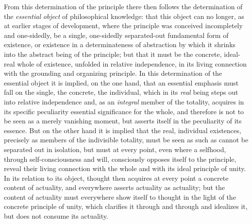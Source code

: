 From this determination of the principle there then follows the
determination of the \emph{essential} \emph{object} of philosophical
knowledge: that this object can no longer, as at earlier stages of
development, where the principle was conceived incompletely and
one-sidedly, be a single, one-sidedly separated-out fundamental form of
existence, or existence in a determinateness of abstraction by which it
shrinks into the abstract being of the principle; but that it must be
the concrete, ideal-real whole of existence, unfolded in relative
independence, in its living connection with the grounding and
organizing principle. In this determination of the essential object it
is implied, on the one hand, that an essential emphasis must fall on
the single, the concrete, the individual, which in its \emph{real}
being steps out into relative independence and, as an \emph{integral}
member of the totality, acquires in its specific peculiarity essential
significance for the whole, and therefore is not to be seen as a merely
vanishing moment, but asserts itself in the peculiarity of its essence.
But on the other hand it is implied that the real, individual
existences, precisely as members of the indivisible totality, must be
seen as such as cannot be separated out in isolation, but must at every
point, even where a selfhood, through self-consciousness and will,
consciously opposes itself to the principle, reveal their living
connection with the whole and with its ideal principle of unity. In its
relation to its object, thought then acquires at every point a concrete
content of actuality, and everywhere asserts actuality as actuality;
but the content of actuality must everywhere show itself to thought in
the light of the concrete principle of unity, which clarifies it
through and through and idealizes it, but does not consume its
actuality.

